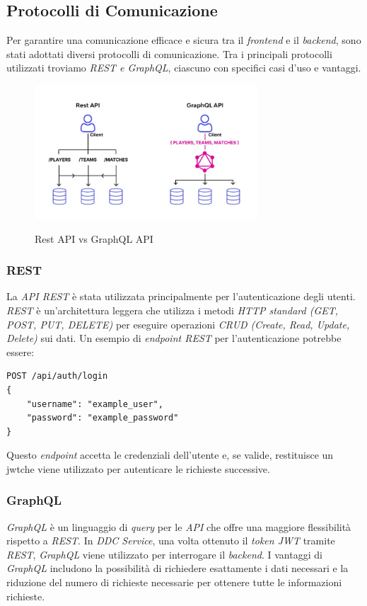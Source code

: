 \subsection{Protocolli di Comunicazione}
\label{subsec:protocolli_comunicazione}

Per garantire una comunicazione efficace e sicura tra il \textit{frontend} e il \textit{backend}, sono stati adottati diversi protocolli di comunicazione.
Tra i principali protocolli utilizzati troviamo \textit{REST e \textit{GraphQL}}, ciascuno con specifici casi d'uso e vantaggi.

\begin{figure}[H]
    \centering
    \includegraphics[alt={Rappresentazione grafica della struttura e differenza tra rest api e graphqlapi}, height=5cm]{img/restgraphql.png}
    \caption{Rest API vs GraphQL API}
    \label{fig:restapivsgraphqlapi}
\end{figure}

\subsubsection{REST}
La \textit{API REST} è stata utilizzata principalmente per l'autenticazione degli utenti.
\textit{REST} è un'architettura leggera che utilizza i metodi \textit{HTTP standard (GET, POST, PUT, DELETE)} per eseguire operazioni \textit{CRUD (Create, Read, Update, Delete)} sui dati.
Un esempio di \textit{endpoint REST} per l'autenticazione potrebbe essere:
\begin{verbatim}
POST /api/auth/login
{
    "username": "example_user",
    "password": "example_password"
}
\end{verbatim}

Questo \textit{endpoint} accetta le credenziali dell'utente e, se valide, restituisce un \gls{jwt}\glox che viene utilizzato per autenticare le richieste successive.

\subsubsection{GraphQL}
\textit{GraphQL} è un linguaggio di \textit{query} per le \textit{API} che offre una maggiore flessibilità rispetto a \textit{REST}.
In \textit{DDC Service}, una volta ottenuto il \textit{token JWT} tramite \textit{REST}, \textit{GraphQL} viene utilizzato per interrogare il \textit{backend}.
I vantaggi di \textit{GraphQL} includono la possibilità di richiedere esattamente i dati necessari e la riduzione del numero di richieste necessarie per ottenere tutte le informazioni richieste.

